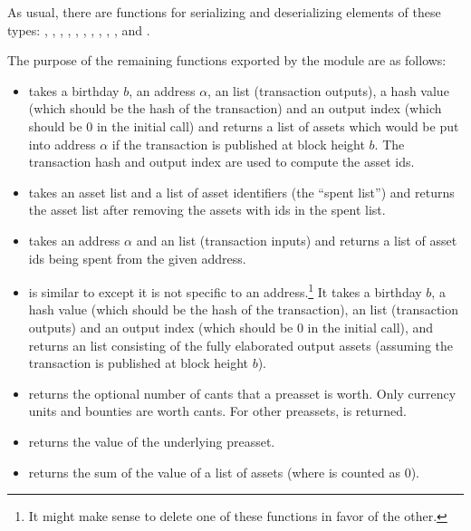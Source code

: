 As usual, there are functions for serializing and deserializing elements of these types:
{},
{},
{},
{},
{},
{},
{},
{},
{},
{},
{}
and
{}.

The purpose of the remaining functions exported by the {} module are as follows:
\begin{itemize}
\item {} takes a birthday $b$, an address $\alpha$,
an {} list (transaction outputs), a hash value (which should
be the hash of the transaction)
and an output index (which should be $0$ in the initial call)
and returns a list of assets which would be put into address $\alpha$
if the transaction is published at block height $b$.
The transaction hash and output index are used to compute the asset ids.
\item {} takes an asset list and a list of asset identifiers (the ``spent list'') and
returns the asset list after removing the assets with ids in the spent list.
\item {} takes an address $\alpha$ and an {} list (transaction inputs)
and returns a list of asset ids being spent from the given address.
\item {} is similar to {} except it is not specific to an address.\footnote{It might make sense to delete one of these functions in favor of the other.}
It takes a birthday $b$, a hash value (which should be the hash of the transaction),
an {} list (transaction outputs)
and an output index (which should be $0$ in the initial call),
and returns an {} list consisting of the fully elaborated output assets
(assuming the transaction is published at block height $b$).
\item {} returns the optional number of cants that a preasset is worth.
Only currency units and bounties are worth cants. For other preassets, {} is returned.
\item {} returns the value of the underlying preasset.
\item {} returns the sum of the value of a list of assets (where {} is counted as $0$).

\end{itemize}

